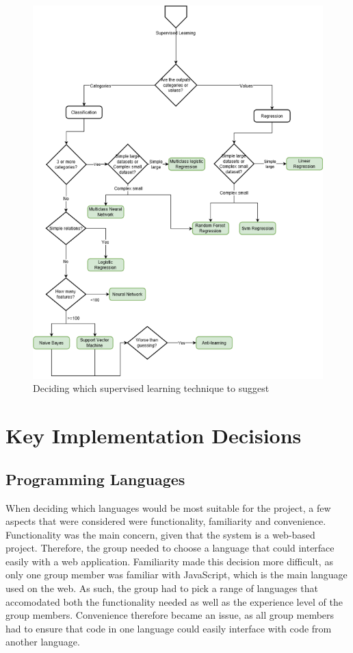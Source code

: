\documentclass[titlepage]{article}
\begin{document}
\begin{figure}[h!]
  \centering
  \includegraphics[width=\textwidth]{supervised-decision}
  \caption{Deciding which supervised learning technique to suggest}
  \label{supervised-decision}
\end{figure} \pagebreak

\section{Key Implementation Decisions}
\subsection{Programming Languages}
When deciding which languages would be most suitable for the project, a few aspects that were considered were functionality, familiarity  and convenience. Functionality was the main concern, given that the system is a web-based project. Therefore, the group needed to choose a language that could interface easily with a web application. Familiarity made this decision more difficult, as only one group member was familiar with JavaScript, which is the main language used on the web. As such, the group had to pick a range of languages that accomodated both the functionality needed as well as the experience level of the group members. Convenience therefore became an issue, as all group members had to ensure that code in one language could easily interface with code from another language.
\end{document}
